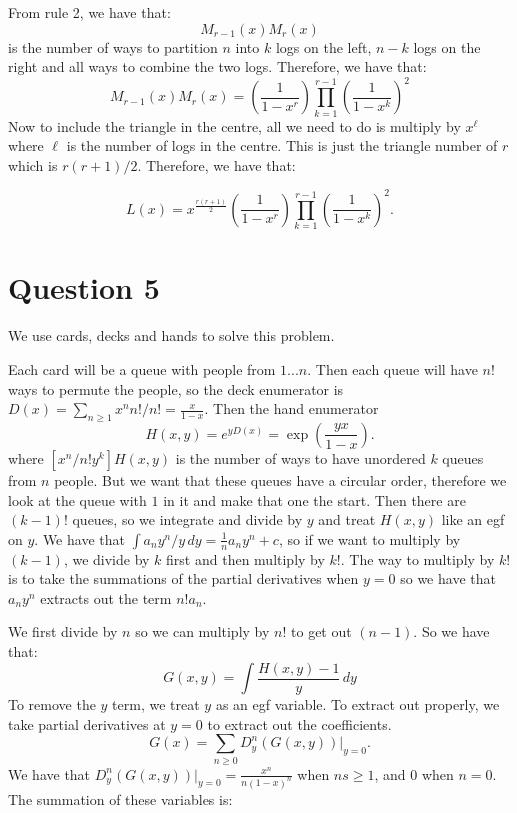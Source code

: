 \documentclass[]{article}
\theoremstyle{definition}
\numberwithin{theorem}{section}
\numberwithin{equation}{section}
\begin{document}
From rule 2, we have that:
\begin{equation}
	[x^n] M_{r-1} (x) M_{r}(x)
\end{equation}
is the number of ways to partition $n$ into $k$ logs on the left, $n - k$ logs on the right and all ways to combine the two logs. Therefore, we have that:
\begin{equation}
	[x^n] M_{r-1} (x) M_{r}(x) = \left(\frac{1}{1 - x^r}\right) \prod_{k = 1}^{r - 1} \left(\frac{1}{1 - x^k}\right)^2 
\end{equation}
Now to include the triangle in the centre, all we need to do is multiply by $x^\ell$ where $\ell$ is the number of logs in the centre. This is just the triangle number of $r$ which is $r(r + 1)/2$. Therefore, we have that:

\begin{equation}
	L(x) = x^{\frac{r(r + 1)}{2}} \left(\frac{1}{1 - x^r}\right) \prod_{k = 1}^{r - 1} \left(\frac{1}{1 - x^k}\right)^2.
\end{equation}
\section{Question 5}

We use cards, decks and hands to solve this problem.

Each card will be a queue with people from $1...n$. Then each queue will have $n!$ ways to permute the people, so the deck enumerator is $D(x) = \sum_{n \geq 1} x^n n!/n! = \frac{x}{1-x}$. 
Then the hand enumerator
\begin{equation}
	H(x,y) = e^{y D(x)} = \exp\left( \frac{yx}{1-x}\right).
\end{equation}
where $[x^n/n! y^k] H(x,y)$ is the number of ways to have unordered $k$ queues from $n$ people. But we want that these queues have a circular order, therefore we look at the queue with $1$ in it and make that one the start. Then there are $(k - 1)!$ queues, so we integrate and divide by $y$ and treat $H(x, y)$ like an egf on $y$. We have that $\int a_n y^n/y \, dy = \frac{1}{n} a_n y^n + c$, so if we want to multiply by $(k - 1)$, we divide by $k$ first and then multiply by $k!$. The way to multiply by $k!$ is to take the summations of the partial derivatives when $y = 0$ so we have that $a_n y^n$ extracts out the term $n! a_n$. 

We first divide by $n$ so we can multiply by $n!$ to get out $(n - 1)$. So we have that:
\begin{equation}
	G(x,y) = \int \frac{H(x, y) - 1}{y} \, dy
\end{equation}
To remove the $y$ term, we treat $y$ as an egf variable. To extract out properly, we take partial derivatives at $y = 0$ to extract out the coefficients.
\begin{equation}
	G(x) = \sum_{n \geq 0} D^n_y(G(x, y))|_{y = 0}.
\end{equation}
We have that $D^n_y(G(x, y))|_{y = 0} = \frac{x^n}{n(1 - x)^n}$ when $ns \geq 1$, and $0$ when $n = 0$. 
The summation of these variables is:
\end{document}
